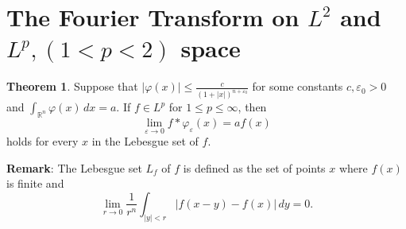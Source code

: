 \documentclass[12pt,openany]{book}
\theoremstyle{definition}
\newtheorem{theorem}{Theorem}[section]
\begin{document}
\section{The Fourier Transform on $L^2$ and $L^p,(1<p<2)$ space}
\begin{theorem}
    Suppose that $|\varphi(x)| \leq \frac{c}{(1+|x|)^{n+\varepsilon_0}}$ for some constants $c, \varepsilon_0 > 0$ and $\int_{\mathbb{R}^n} \varphi(x) \, dx = a$. If $f \in L^p$ for $1 \leq p \leq \infty$, then
$$\lim_{\varepsilon \rightarrow 0} f * \varphi_{\varepsilon}(x) = a f(x)$$
holds for every $x$ in the Lebesgue set of $f$.

\noindent\textbf{Remark}: The Lebesgue set $L_f$ of $f$ is defined as the set of points $x$ where $f(x)$ is finite and
$$\lim_{r \rightarrow 0} \frac{1}{r^n} \int_{|y| < r} |f(x-y) - f(x)| \, dy = 0.$$
\end{theorem}
\end{document}
